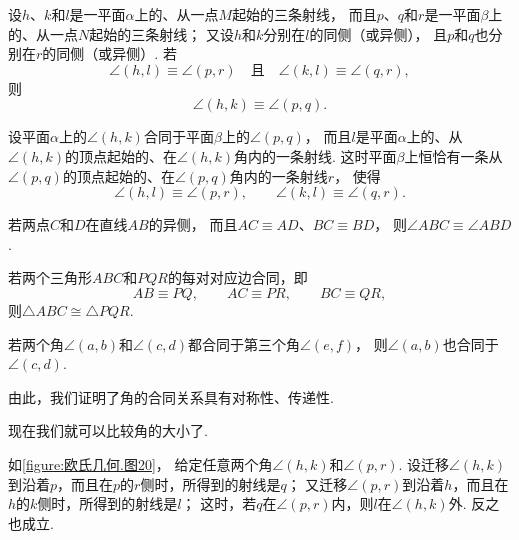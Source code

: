 \begin{theorem}\label{theorem:欧氏几何.定理15}
设\(h\)、\(k\)和\(l\)是一平面\(\alpha\)上的、从一点\(M\)起始的三条射线，
而且\(p\)、\(q\)和\(r\)是一平面\(\beta\)上的、从一点\(N\)起始的三条射线；%
又设\(h\)和\(k\)分别在\(l\)的同侧（或异侧），
且\(p\)和\(q\)也分别在\(r\)的同侧（或异侧）.
若
\[
\angle(h,l) \equiv \angle(p,r)
\quad\text{且}\quad
\angle(k,l) \equiv \angle(q,r),
\]
则
\[
\angle(h,k) \equiv \angle(p,q).
\]
\end{theorem}

\begin{theorem}\label{theorem:欧氏几何.定理16}
设平面\(\alpha\)上的\(\angle(h,k)\)合同于平面\(\beta\)上的\(\angle(p,q)\)，
而且\(l\)是平面\(\alpha\)上的、从\(\angle(h,k)\)的顶点起始的、在\(\angle(h,k)\)角内的一条射线.
这时平面\(\beta\)上恒恰有一条从\(\angle(p,q)\)的顶点起始的、在\(\angle(p,q)\)角内的一条射线\(r\)，
使得
\[
\angle(h,l) \equiv \angle(p,r), \qquad
\angle(k,l) \equiv \angle(q,r).
\]
\end{theorem}

\begin{theorem}\label{theorem:欧氏几何.定理17}
若两点\(C\)和\(D\)在直线\(AB\)的异侧，
而且\(AC \equiv AD\)、\(BC \equiv BD\)，
则\(\angle ABC \equiv \angle ABD\).
\end{theorem}

\begin{theorem}[三角形的合同定理3]\label{theorem:欧氏几何.定理18}
若两个三角形\(ABC\)和\(PQR\)的每对对应边合同，即
\[
AB \equiv PQ, \qquad
AC \equiv PR, \qquad
BC \equiv QR,
\]
则\(\triangle ABC \cong \triangle PQR\).
\end{theorem}

\begin{theorem}\label{theorem:欧氏几何.定理19}
若两个角\(\angle(a,b)\)和\(\angle(c,d)\)都合同于第三个角\(\angle(e,f)\)，
则\(\angle(a,b)\)也合同于\(\angle(c,d)\).
\end{theorem}
由此，我们证明了角的合同关系具有对称性、传递性.

现在我们就可以比较角的大小了.

\begin{theorem}\label{theorem:欧氏几何.定理20}
如\cref{figure:欧氏几何.图20}，
给定任意两个角\(\angle(h,k)\)和\(\angle(p,r)\).
设迁移\(\angle(h,k)\)到沿着\(p\)，而且在\(p\)的\(r\)侧时，所得到的射线是\(q\)；
又迁移\(\angle(p,r)\)到沿着\(h\)，而且在\(h\)的\(k\)侧时，所得到的射线是\(l\)；
这时，若\(q\)在\(\angle(p,r)\)内，则\(l\)在\(\angle(h,k)\)外.
反之也成立.
\end{theorem}

